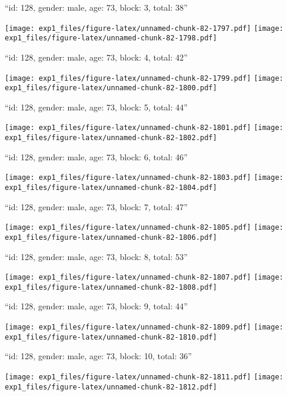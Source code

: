 \documentclass[11pt,,]{article}
\begin{document}
\newpage
[1] 

``id: 128, gender: male, age: 73, block: 3, total: 38''

\texttt{[image: exp1\_files/figure-latex/unnamed-chunk-82-1797.pdf]}
\texttt{[image: exp1\_files/figure-latex/unnamed-chunk-82-1798.pdf]}

\newpage
[1] 

``id: 128, gender: male, age: 73, block: 4, total: 42''

\texttt{[image: exp1\_files/figure-latex/unnamed-chunk-82-1799.pdf]}
\texttt{[image: exp1\_files/figure-latex/unnamed-chunk-82-1800.pdf]}

\newpage
[1] 

``id: 128, gender: male, age: 73, block: 5, total: 44''

\texttt{[image: exp1\_files/figure-latex/unnamed-chunk-82-1801.pdf]}
\texttt{[image: exp1\_files/figure-latex/unnamed-chunk-82-1802.pdf]}

\newpage
[1] 

``id: 128, gender: male, age: 73, block: 6, total: 46''

\texttt{[image: exp1\_files/figure-latex/unnamed-chunk-82-1803.pdf]}
\texttt{[image: exp1\_files/figure-latex/unnamed-chunk-82-1804.pdf]}

\newpage
[1] 

``id: 128, gender: male, age: 73, block: 7, total: 47''

\texttt{[image: exp1\_files/figure-latex/unnamed-chunk-82-1805.pdf]}
\texttt{[image: exp1\_files/figure-latex/unnamed-chunk-82-1806.pdf]}

\newpage
[1] 

``id: 128, gender: male, age: 73, block: 8, total: 53''

\texttt{[image: exp1\_files/figure-latex/unnamed-chunk-82-1807.pdf]}
\texttt{[image: exp1\_files/figure-latex/unnamed-chunk-82-1808.pdf]}

\newpage
[1] 

``id: 128, gender: male, age: 73, block: 9, total: 44''

\texttt{[image: exp1\_files/figure-latex/unnamed-chunk-82-1809.pdf]}
\texttt{[image: exp1\_files/figure-latex/unnamed-chunk-82-1810.pdf]}

\newpage
[1] 

``id: 128, gender: male, age: 73, block: 10, total: 36''

\texttt{[image: exp1\_files/figure-latex/unnamed-chunk-82-1811.pdf]}
\texttt{[image: exp1\_files/figure-latex/unnamed-chunk-82-1812.pdf]}
\end{document}
